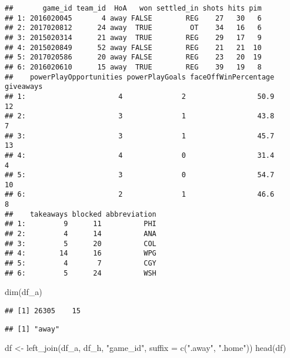 \documentclass[
]{article}
\newenvironment{Shaded}{\begin{snugshade}}{\end{snugshade}}
\newcommand{\AttributeTok}[1]{\textcolor[rgb]{0.77,0.63,0.00}{#1}}
\newcommand{\FunctionTok}[1]{\textcolor[rgb]{0.00,0.00,0.00}{#1}}
\newcommand{\NormalTok}[1]{#1}
\newcommand{\OtherTok}[1]{\textcolor[rgb]{0.56,0.35,0.01}{#1}}
\newcommand{\SpecialCharTok}[1]{\textcolor[rgb]{0.00,0.00,0.00}{#1}}
\newcommand{\StringTok}[1]{\textcolor[rgb]{0.31,0.60,0.02}{#1}}
\begin{document}
\begin{verbatim}
##       game_id team_id  HoA   won settled_in shots hits pim
## 1: 2016020045       4 away FALSE        REG    27   30   6
## 2: 2017020812      24 away  TRUE         OT    34   16   6
## 3: 2015020314      21 away  TRUE        REG    29   17   9
## 4: 2015020849      52 away FALSE        REG    21   21  10
## 5: 2017020586      20 away FALSE        REG    23   20  19
## 6: 2016020610      15 away  TRUE        REG    39   19   8
##    powerPlayOpportunities powerPlayGoals faceOffWinPercentage giveaways
## 1:                      4              2                 50.9        12
## 2:                      3              1                 43.8         7
## 3:                      3              1                 45.7        13
## 4:                      4              0                 31.4         4
## 5:                      3              0                 54.7        10
## 6:                      2              1                 46.6         8
##    takeaways blocked abbreviation
## 1:         9      11          PHI
## 2:         4      14          ANA
## 3:         5      20          COL
## 4:        14      16          WPG
## 5:         4       7          CGY
## 6:         5      24          WSH
\end{verbatim}

\begin{Shaded}
\begin{Highlighting}[]
\FunctionTok{dim}\NormalTok{(df\_a)}
\end{Highlighting}
\end{Shaded}

\begin{verbatim}
## [1] 26305    15
\end{verbatim}

\begin{Shaded}
\end{Shaded}

\begin{verbatim}
## [1] "away"
\end{verbatim}

\begin{Shaded}
\begin{Highlighting}[]
\NormalTok{df }\OtherTok{\textless{}{-}} \FunctionTok{left\_join}\NormalTok{(df\_a, df\_h, }\StringTok{"game\_id"}\NormalTok{, }\AttributeTok{suffix =} \FunctionTok{c}\NormalTok{(}\StringTok{".away"}\NormalTok{, }\StringTok{".home"}\NormalTok{))}
\FunctionTok{head}\NormalTok{(df)}
\end{Highlighting}
\end{Shaded}
\end{document}
